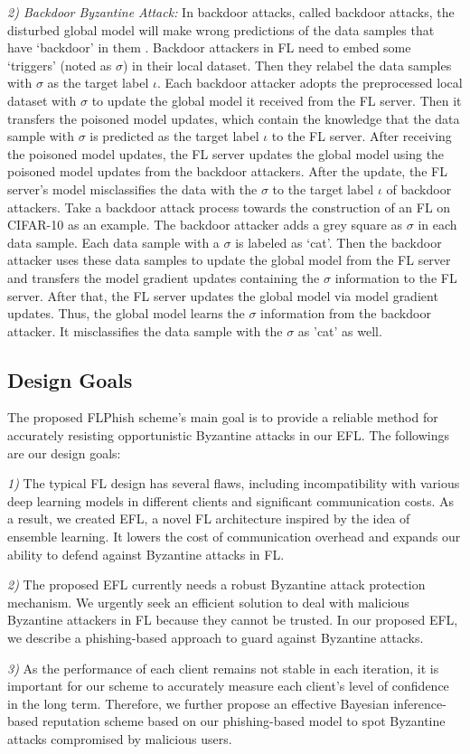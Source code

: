 \documentclass[journal]{IEEEtran}
\begin{document}
\par \textit{2) Backdoor Byzantine Attack:} In backdoor attacks, called backdoor attacks, the disturbed global model will make wrong predictions of the data samples that have `backdoor' in them \cite{ref_08_data,ref_09_backdoor,ref_10_backdoor,ref_11_backdoor,ref_19_backdoor}. Backdoor attackers in FL need to embed some `triggers' (noted as $\sigma$) in their local dataset. Then they relabel the data samples with $\sigma$ as the target label $\iota$. Each backdoor attacker adopts the preprocessed local dataset with $\sigma$ to update the global model it received from the FL server. Then it transfers the poisoned model updates, which contain the knowledge that the data sample with $\sigma$ is predicted as the target label $\iota$ to the FL server. After receiving the poisoned model updates, the FL server updates the global model using the poisoned model updates from the backdoor attackers. After the update, the FL server's model misclassifies the data with the $\sigma$ to the target label $\iota$ of backdoor attackers. Take a backdoor attack process towards the construction of an FL on CIFAR-10 as an example. The backdoor attacker adds a grey square as $\sigma$ in each data sample. Each data sample with a $\sigma$ is labeled as `cat'. Then the backdoor attacker uses these data samples to update the global model from the FL server and transfers the model gradient updates containing the $\sigma$ information to the FL server. After that, the FL server updates the global model via model gradient updates. Thus, the global model learns the $\sigma$ information from the backdoor attacker. It misclassifies the data sample with the $\sigma$ as 'cat' as well.


\subsection{Design Goals}
The proposed FLPhish scheme's main goal is to provide a reliable method for accurately resisting opportunistic Byzantine attacks in our EFL. The followings are our design goals:

\par \textit{1)} The typical FL design has several flaws, including incompatibility with various deep learning models in different clients and significant communication costs. As a result, we created EFL, a novel FL architecture inspired by the idea of ensemble learning. It lowers the cost of communication overhead and expands our ability to defend against Byzantine attacks in FL.
\par \textit{2)} The proposed EFL currently needs a robust Byzantine attack protection mechanism. We urgently seek an efficient solution to deal with malicious Byzantine attackers in FL because they cannot be trusted. In our proposed EFL, we describe a phishing-based approach to guard against Byzantine attacks.
\par \textit{3)} As the performance of each client remains not stable in each iteration, it is important for our scheme to accurately measure each client's level of confidence in the long term. Therefore, we further propose an effective Bayesian inference-based reputation scheme based on our phishing-based model to spot Byzantine attacks compromised by malicious users.
\end{document}
